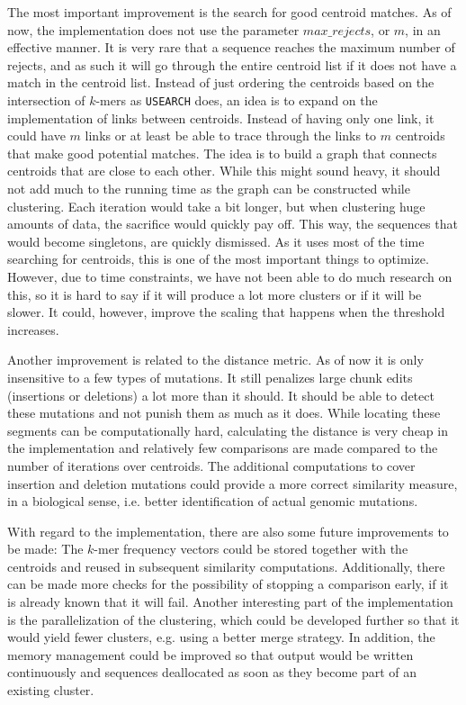 The most important improvement is the search for good centroid matches. As of
now, the implementation does not use the parameter $max\_rejects$, or $m$, in
an effective manner. It is very rare that a sequence reaches the maximum number
of rejects, and as such it will go through the entire centroid list if it does
not have a match in the centroid list. Instead of just ordering the centroids
based on the intersection of $k$-mers as \texttt{USEARCH} does, an idea is to
expand on the implementation of links between centroids. Instead of having only
one link, it could have $m$ links or at least be able to trace through the
links to $m$ centroids that make good potential matches. The idea is to build a
graph that connects centroids that are close to each other.  While this might
sound heavy, it should not add much to the running time as the graph can be
constructed while clustering. Each iteration would take a bit longer, but when
clustering huge amounts of data, the sacrifice would quickly pay off. This way,
the sequences that would become singletons, are quickly dismissed. As it uses
most of the time searching for centroids, this is one of the most important
things to optimize. However, due to time constraints, we have not been able to
do much research on this, so it is hard to say if it will produce a lot more
clusters or if it will be slower. It could, however, improve the scaling that
happens when the threshold increases.

Another improvement is related to the distance metric. As of now it is only
insensitive to a few types of mutations. It still penalizes large chunk edits
(insertions or deletions) a lot more than it should. It should be able to
detect these mutations and not punish them as much as it does. While locating
these segments can be computationally hard, calculating the distance is very
cheap in the implementation and relatively few comparisons are made compared to
the number of iterations over centroids. The additional computations to cover
insertion and deletion mutations could provide a more correct similarity
measure, in a biological sense, i.e. better identification of actual genomic
mutations.

With regard to the implementation, there are also some future improvements to
be made: The $k$-mer frequency vectors could be stored together with the
centroids and reused in subsequent similarity computations. Additionally, there
can be made more checks for the possibility of stopping a comparison early, if
it is already known that it will fail. Another interesting part of the
implementation is the parallelization of the clustering, which could be
developed further so that it would yield fewer clusters, e.g. using a better
merge strategy. In addition, the memory management could be improved so that
output would be written continuously and sequences deallocated as soon as they
become part of an existing cluster.

